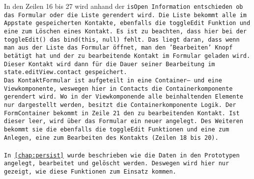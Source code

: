 In den Zeilen 16 bis 27 wird anhand der \tt{isOpen} Information entschieden ob das Formular oder die Liste gerendert wird.
Die Liste bekommt alle im \gls{App}state gespeicherten Kontakte, ebenfalls die \tt{toggleEdit} Funktion und eine zum Löschen eines Kontakt. Es ist zu beachten, dass hier bei der \tt{toggleEdit()} das \tt{bind(this, null)} fehlt. Das liegt daran, dass wenn man aus der Liste das Formular öffnet, man den 'Bearbeiten' Knopf betätigt hat und der zu bearbeitende Kontakt im Formular geladen wird. Dieser Kontakt wird dann für die Dauer seiner Bearbeitung im \tt{state.editView.contact} gespeichert.\\
Das KontaktFormular ist aufgeteilt in eine Container-- und eine Viewkomponente, weswegen hier in \tt{Contacts} die Containerkomponente gerendert wird.
Wo in der Viewkomponende alle beinhaltenden Elemente nur dargestellt werden, besitzt die Containerkomponente Logik.
Der \tt{FormContainer} bekommt in Zeile 21 den zu bearbeitenden Kontakt. Ist dieser leer, wird über das Formular ein neuer angelegt.
Des Weiteren bekommt sie die ebenfalls die \tt{toggleEdit} Funktionen und eine zum Anlegen, eine zum Bearbeiten des Kontakts (Zeilen 18 bis 20).\\\\
In \autoref{chap:persist} wurde beschrieben wie die Daten in den Prototypen angelegt, bearbeitet und gelöscht werden. Deswegen wird hier nur gezeigt, wie diese Funktionen zum Einsatz kommen.